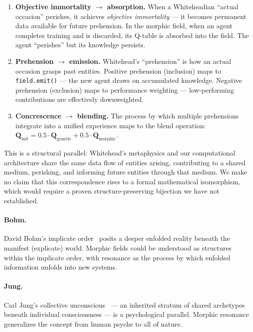 \documentclass[twoside,11pt]{article}
\begin{document}
\begin{enumerate}[leftmargin=2em]
    \item \textbf{Objective immortality $\rightarrow$ absorption.}
          When a Whiteheadian ``actual occasion'' perishes, it achieves
          \emph{objective immortality} --- it becomes permanent data available
          for future prehension.  In the morphic field, when an agent
          completes training and is discarded, its Q-table is absorbed into
          the field.  The agent ``perishes'' but its knowledge persists.
    \item \textbf{Prehension $\rightarrow$ emission.}
          Whitehead's ``prehension'' is how an actual occasion grasps past
          entities.  Positive prehension (inclusion) maps to
          \texttt{field.emit()} --- the new agent draws on accumulated
          knowledge.  Negative prehension (exclusion) maps to
          performance weighting --- low-performing contributions are
          effectively downweighted.
    \item \textbf{Concrescence $\rightarrow$ blending.}
          The process by which multiple prehensions integrate into a unified
          experience maps to the blend operation:
          $\mathbf{Q}_{\text{init}} = 0.5 \cdot \mathbf{Q}_{\text{genetic}}
          + 0.5 \cdot \mathbf{Q}_{\text{morphic}}$.
\end{enumerate}

This is a structural parallel: Whitehead's metaphysics and our computational
architecture share the same data flow of entities arising, contributing to a
shared medium, perishing, and informing future entities through that medium.
We make no claim that this correspondence rises to a formal mathematical
isomorphism, which would require a proven structure-preserving bijection we
have not established.

\paragraph{Bohm.}
David Bohm's implicate order~\citep{bohm1980} posits a deeper enfolded
reality beneath the manifest (explicate) world.  Morphic fields could be
understood as structures within the implicate order, with resonance as the
process by which enfolded information unfolds into new systems.

\paragraph{Jung.}
Carl Jung's collective unconscious~\citep{jung1959} --- an inherited stratum
of shared archetypes beneath individual consciousness --- is a psychological
parallel.  Morphic resonance generalizes the concept from human psyche to all
of nature.
\end{document}
